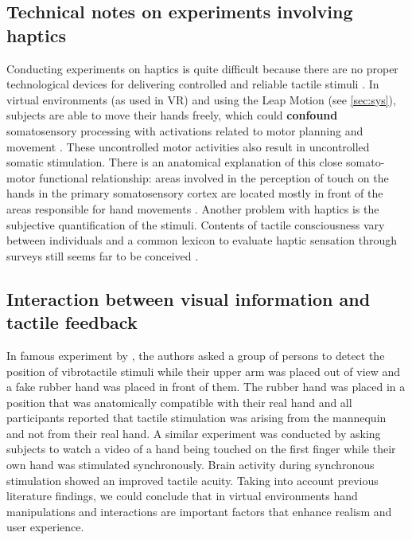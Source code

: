 \documentclass{vgtc}
\begin{document}
\subsection{Technical notes on experiments involving haptics}
Conducting experiments on haptics is quite difficult because there are no proper technological devices for delivering controlled and reliable tactile stimuli \cite{Gallace2012}. In virtual environments (as used in VR) and using the Leap Motion \cite{leapwebsite} (see \autoref{sec:sys}), subjects are able to move their hands freely, which could \textbf{confound} somatosensory processing with activations related to motor planning and movement \cite{Bodegard2001}. These uncontrolled motor activities also result in uncontrolled somatic stimulation. There is an anatomical explanation of this close somato-motor functional relationship: areas involved in the perception of touch on the hands in the primary somatosensory cortex are located mostly in front of the areas responsible for hand movements \cite{Penfield1950}.
Another problem with haptics is the subjective quantification of the stimuli. Contents of tactile consciousness vary between individuals and a common lexicon to evaluate haptic sensation through surveys still seems far to be conceived \cite{Gallace2010}.

\subsection{Interaction between visual information and tactile feedback}
In famous experiment by \cite{Pavani2000}, the authors asked a group of persons to detect the position of vibrotactile stimuli while their upper arm was placed out of view and a fake rubber hand was placed in front of them. The rubber hand was placed in a position that was anatomically compatible with their real hand and all participants reported that tactile stimulation was arising from the mannequin and not from their real hand. A similar experiment was conducted by \cite{Schaefer2006} asking subjects to watch a video of a hand being touched on the first finger while their own hand was stimulated synchronously. Brain activity during synchronous stimulation showed an improved tactile acuity. Taking into account previous literature findings, we could conclude that in virtual environments hand manipulations and interactions are important factors that enhance realism and user experience. 
\end{document}
